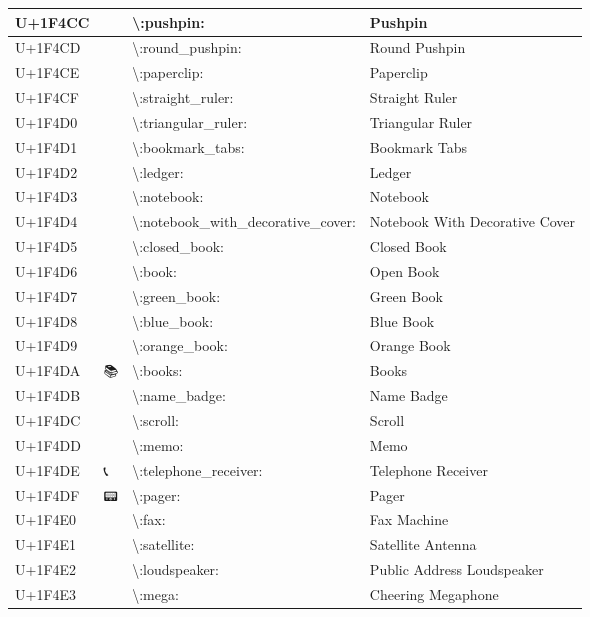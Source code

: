 \begin{table}[h]
\begin{tabulary}{\linewidth}{|L|L|L|L|}
\hline
U+1F4CC & 📌 & {\textbackslash}:pushpin: & Pushpin \\
\hline
U+1F4CD & 📍 & {\textbackslash}:round\_pushpin: & Round Pushpin \\
\hline
U+1F4CE & 📎 & {\textbackslash}:paperclip: & Paperclip \\
\hline
U+1F4CF & 📏 & {\textbackslash}:straight\_ruler: & Straight Ruler \\
\hline
U+1F4D0 & 📐 & {\textbackslash}:triangular\_ruler: & Triangular Ruler \\
\hline
U+1F4D1 & 📑 & {\textbackslash}:bookmark\_tabs: & Bookmark Tabs \\
\hline
U+1F4D2 & 📒 & {\textbackslash}:ledger: & Ledger \\
\hline
U+1F4D3 & 📓 & {\textbackslash}:notebook: & Notebook \\
\hline
U+1F4D4 & 📔 & {\textbackslash}:notebook\_with\_decorative\_cover: & Notebook With Decorative Cover \\
\hline
U+1F4D5 & 📕 & {\textbackslash}:closed\_book: & Closed Book \\
\hline
U+1F4D6 & 📖 & {\textbackslash}:book: & Open Book \\
\hline
U+1F4D7 & 📗 & {\textbackslash}:green\_book: & Green Book \\
\hline
U+1F4D8 & 📘 & {\textbackslash}:blue\_book: & Blue Book \\
\hline
U+1F4D9 & 📙 & {\textbackslash}:orange\_book: & Orange Book \\
\hline
U+1F4DA & 📚 & {\textbackslash}:books: & Books \\
\hline
U+1F4DB & 📛 & {\textbackslash}:name\_badge: & Name Badge \\
\hline
U+1F4DC & 📜 & {\textbackslash}:scroll: & Scroll \\
\hline
U+1F4DD & 📝 & {\textbackslash}:memo: & Memo \\
\hline
U+1F4DE & 📞 & {\textbackslash}:telephone\_receiver: & Telephone Receiver \\
\hline
U+1F4DF & 📟 & {\textbackslash}:pager: & Pager \\
\hline
U+1F4E0 & 📠 & {\textbackslash}:fax: & Fax Machine \\
\hline
U+1F4E1 & 📡 & {\textbackslash}:satellite: & Satellite Antenna \\
\hline
U+1F4E2 & 📢 & {\textbackslash}:loudspeaker: & Public Address Loudspeaker \\
\hline
U+1F4E3 & 📣 & {\textbackslash}:mega: & Cheering Megaphone \\
\hline

\end{tabulary}
\end{table}
